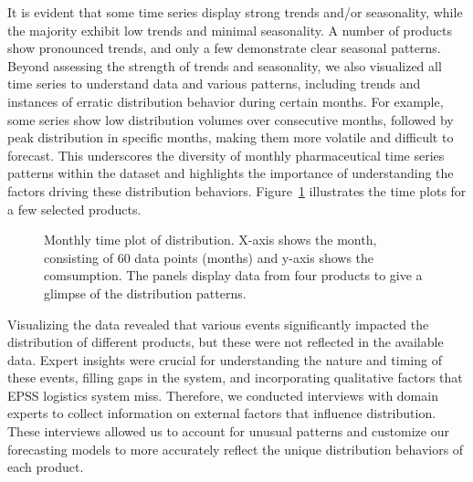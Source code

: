 \documentclass[
  authoryear,
  preprint,
  3p]{elsarticle}
\begin{document}
It is evident that some time series display strong trends and/or
seasonality, while the majority exhibit low trends and minimal
seasonality. A number of products show pronounced trends, and only a few
demonstrate clear seasonal patterns. Beyond assessing the strength of
trends and seasonality, we also visualized all time series to understand
data and various patterns, including trends and instances of erratic
distribution behavior during certain months. For example, some series
show low distribution volumes over consecutive months, followed by peak
distribution in specific months, making them more volatile and difficult
to forecast. This underscores the diversity of monthly pharmaceutical
time series patterns within the dataset and highlights the importance of
understanding the factors driving these distribution behaviors.
Figure~\ref{fig-dataviz2} illustrates the time plots for a few selected
products.

\begin{figure}


\caption{\label{fig-dataviz2}Monthly time plot of distribution. X-axis
shows the month, consisting of 60 data points (months) and y-axis shows
the comsumption. The panels display data from four products to give a
glimpse of the distribution patterns.}

\end{figure}%

Visualizing the data revealed that various events significantly impacted
the distribution of different products, but these were not reflected in
the available data. Expert insights were crucial for understanding the
nature and timing of these events, filling gaps in the system, and
incorporating qualitative factors that EPSS logistics system miss.
Therefore, we conducted interviews with domain experts to collect
information on external factors that influence distribution. These
interviews allowed us to account for unusual patterns and customize our
forecasting models to more accurately reflect the unique distribution
behaviors of each product.
\end{document}
